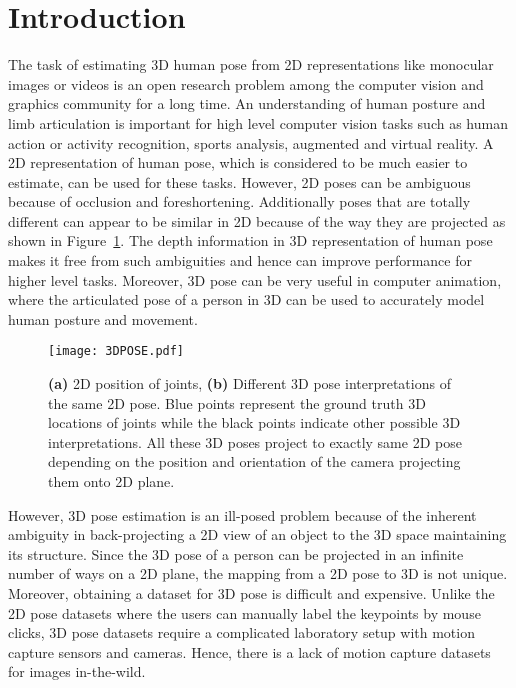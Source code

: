 \documentclass[runningheads]{llncs}
\begin{document}
\section{Introduction}

The task of estimating 3D human pose from 2D representations like monocular images or videos is an open research problem among the computer vision and graphics community for a long time. An understanding of human posture and limb articulation is important for high level computer vision tasks such as human action or activity recognition, sports analysis, augmented and virtual reality. A 2D representation of human pose, which is considered to be much easier to estimate, can be used for these tasks. However, 2D poses can be ambiguous  because of occlusion and foreshortening. Additionally poses that are totally different can appear to be similar in 2D because of the way they are projected as shown in Figure~\ref{fig:difficulty}. The depth information in 3D representation of human pose makes it free from such ambiguities and hence can improve performance for higher level tasks.  Moreover, 3D pose can be very useful in computer animation, where the articulated pose of a person in 3D can be used to accurately model human posture and movement. 
\begin{figure}[t]
\begin{center}
\texttt{[image: 3DPOSE.pdf]}
\end{center}
\caption{\textbf{(a)} 2D position of joints, \textbf{(b)} Different 3D pose interpretations of the same 2D pose. Blue points represent the ground truth 3D locations of joints while the black points indicate other possible 3D interpretations. All these 3D poses project to exactly same 2D pose depending on the position and orientation of the camera projecting them onto 2D plane.}
\vspace{-3mm}
\label{fig:difficulty}   \end{figure}
However, 3D pose estimation is an ill-posed problem because of the inherent ambiguity in back-projecting a 2D view of an object to the 3D space maintaining its structure. Since the 3D pose of a person can be projected in an infinite number of ways on a 2D plane, the mapping from a 2D pose to 3D is not unique. Moreover, obtaining a dataset for 3D pose is difficult and expensive. Unlike the 2D pose datasets where the users can manually label the keypoints by mouse clicks, 3D pose datasets require a complicated laboratory setup with motion capture sensors and cameras. Hence, there is a lack of motion capture datasets for images in-the-wild.
\end{document}
